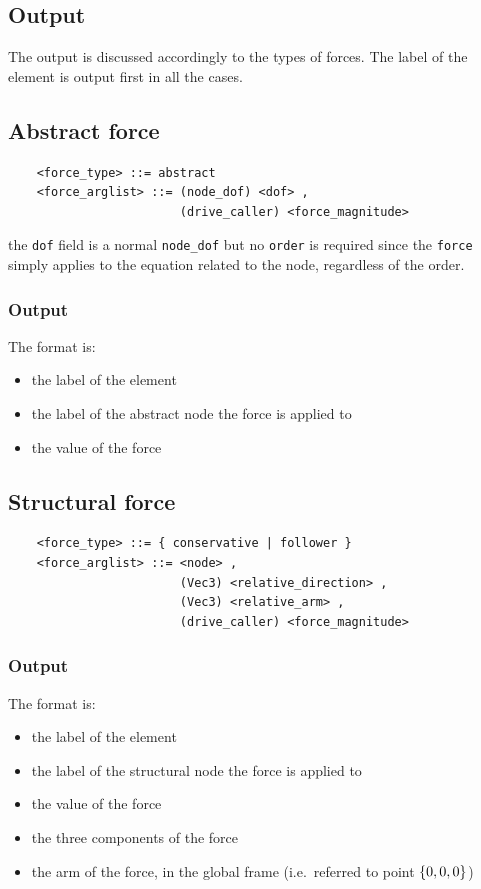 \subsection{Output}
The output is discussed accordingly to the types of forces. 
The label of the element is output first in all the cases.

\subsection{Abstract force}
\begin{verbatim}
    <force_type> ::= abstract 
    <force_arglist> ::= (node_dof) <dof> ,
                        (drive_caller) <force_magnitude>
\end{verbatim}
the \texttt{dof} field is a normal \texttt{node\_dof} but no \texttt{order} is required
since the \texttt{force} simply applies to the equation related to the node,
regardless of the order.

\subsubsection{Output}
The format is:
\begin{itemize}
    \item the label of the element
    \item the label of the abstract node the force is applied to
    \item the value of the force
\end{itemize}


\subsection{Structural force}
\begin{verbatim}
    <force_type> ::= { conservative | follower } 
    <force_arglist> ::= <node> , 
                        (Vec3) <relative_direction> ,
                        (Vec3) <relative_arm> ,
                        (drive_caller) <force_magnitude>
\end{verbatim}

\subsubsection{Output}
The format is:
\begin{itemize}
    \item the label of the element
    \item the label of the structural node the force is applied to
    \item the value of the force
    \item the three components of the force
    \item the arm of the force, in the global frame (i.e.\ referred
          to point $ \left\{ 0,0,0 \right\} $)
\end{itemize}


